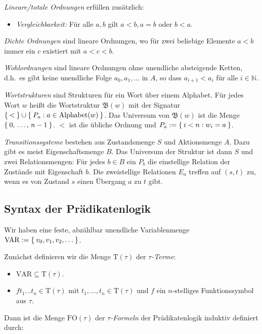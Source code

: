 \documentclass[a4paper,parskip=half*,DIV=15,fontsize=11pt]{scrartcl}
\newcommand{\FO}{\mathrm{FO}}
\newcommand{\VAR}{\mathrm{VAR}}
\newcommand{\T}{\mathrm{T}}
\begin{document}
\emph{Lineare/totale Ordnungen} erfüllen zusätzlich:
\begin{itemize}
  \item \emph{Vergleichbarkeit:} Für alle $a,b$ gilt $a < b, a = b$ oder $b < a$.
\end{itemize}

\emph{Dichte Ordnungen} sind lineare Ordnungen, wo für zwei beliebige Elemente $a < b$ immer ein $c$ existiert mit $a < c < b$.

\emph{Wohlordnungen} sind lineare Ordnungen ohne unendliche absteigende Ketten, d.h.\ es gibt keine unendliche Folge $a_0, a_1, \ldots$ in $A$, so dass $a_{i+1} < a_i$ für alle $i \in \mathbb{N}$.

\emph{Wortstrukturen} sind Strukturen für ein Wort über einem Alphabet. Für jedes Wort $w$ heißt die Wortstruktur $\mathfrak{B}(w)$ mit der Signatur $\Set{<} \cup \Set{P_a : a \in \mathrm{Alphabet}(w)}$. Das Universum von $\mathfrak{B}(w)$ ist die Menge $\Set{0,\, \ldots,\, n-1}$. $<$ ist die übliche Ordnung und $P_a := \Set{i < n : w_i = a}$.

\emph{Transitionssysteme} bestehen aus Zustandsmenge $S$ und Aktionsmenge $A$. Dazu gibt es meist Eigenschaftsmenge $B$. Das Universum der Struktur ist dann $S$ und zwei Relationsmengen: Für jedes $b \in B$ ein $P_b$ die einstellige Relation der Zustände mit Eigenschaft $b$. Die zweistellige Relationen $E_a$ treffen auf $(s,t)$ zu, wenn es von Zustand $s$ einen Übergang $a$ zu $t$ gibt.

\subsection{Syntax der Prädikatenlogik}

Wir haben eine feste, abzählbar unendliche Variablenmenge $\VAR := \Set{v_0, v_1, v_2, \ldots}$.

Zunächst definieren wir die Menge $\T(\tau)$ der \emph{$\tau$-Terme}:
\begin{itemize}
    \item $\VAR \subseteq \T(\tau)$.
    \item $f t_1 \ldots t_n \in \T(\tau)$ mit $t_1, \ldots, t_n \in \T(\tau)$ und $f$ ein $n$-stelliges Funktionssymbol aus $\tau$.
\end{itemize}

Dann ist die Menge $\FO(\tau)$ der \emph{$\tau$-Formeln} der Prädikatenlogik induktiv definiert durch:
\end{document}
